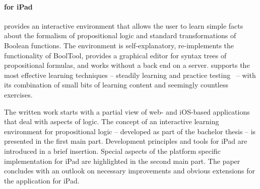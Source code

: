 \paragraph{\Nyaya for iPad}provides an interactive environment
that allows the user to learn simple facts about the formalism of propositional logic 
and standard transformations of Boolean functions. 
The environment is self-explanatory, re-implements the functionality of  BoolTool,
provides a graphical editor for syntax trees of propositional formulas, and 
works without a back end on a server.
\Nyaya supports the most effective learning techniques – 
steadily learning and practice testing\ \cite{Dunlosky01012013} –
with its combination 
of small bits of learning content and seemingly countless exercises. 

The written work starts with a partial view of web- and iOS-based applications that deal with aspects of logic. 
The concept of an interactive learning environment for propositional logic
– developed as part of the bachelor thesis – is presented in the first main part. 
Development principles and tools for iPad  are introduced in a brief insertion.
Special aspects of the platform specific implementation for iPad are highlighted in the second main part. 
The paper concludes with an outlook on necessary improvements and obvious extensions for the application \Nyaya for iPad. 


%
